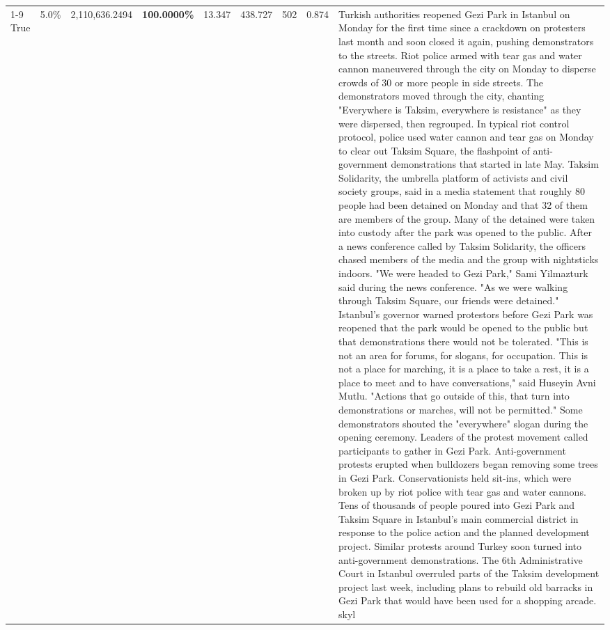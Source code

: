 \begin{table}[H]
\begin{tabular}{lllrlllll}
\cline{1-9}
True & 5.0\% & 2,110,636.2494 & \bfseries \color{red} 100.0000\% & 13.347 & 438.727 & 502 & 0.874 & Turkish authorities reopened Gezi Park in Istanbul on Monday for the first time since a crackdown on protesters last month and soon closed it again, pushing demonstrators to the streets. Riot police armed with tear gas and water cannon maneuvered through the city on Monday to disperse crowds of 30 or more people in side streets. The demonstrators moved through the city, chanting "Everywhere is Taksim, everywhere is resistance" as they were dispersed, then regrouped. In typical riot control protocol, police used water cannon and tear gas on Monday to clear out Taksim Square, the flashpoint of anti-government demonstrations that started in late May. Taksim Solidarity, the umbrella platform of activists and civil society groups, said in a media statement that roughly 80 people had been detained on Monday and that 32 of them are members of the group. Many of the detained were taken into custody after the park was opened to the public. After a news conference called by Taksim Solidarity, the officers chased members of the media and the group with nightsticks indoors. "We were headed to Gezi Park," Sami Yilmazturk said during the news conference. "As we were walking through Taksim Square, our friends were detained." Istanbul's governor warned protestors before Gezi Park was reopened that the park would be opened to the public but that demonstrations there would not be tolerated. "This is not an area for forums, for slogans, for occupation. This is not a place for marching, it is a place to take a rest, it is a place to meet and to have conversations," said Huseyin Avni Mutlu. "Actions that go outside of this, that turn into demonstrations or marches, will not be permitted." Some demonstrators shouted the "everywhere" slogan during the opening ceremony. Leaders of the protest movement called participants to gather in Gezi Park. Anti-government protests erupted when bulldozers began removing some trees in Gezi Park. Conservationists held sit-ins, which were broken up by riot police with tear gas and water cannons. Tens of thousands of people poured into Gezi Park and Taksim Square in Istanbul's main commercial district in response to the police action and the planned development project. Similar protests around Turkey soon turned into anti-government demonstrations. The 6th Administrative Court in Istanbul overruled parts of the Taksim development project last week, including plans to rebuild old barracks in Gezi Park that would have been used for a shopping arcade. skyl \\

\end{tabular}
\end{table}

